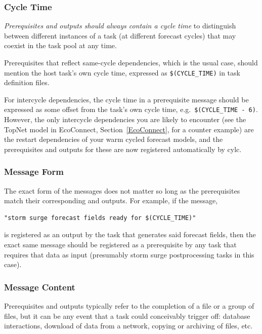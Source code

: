 \documentclass[11pt,a4paper]{article}
\begin{document}
\lstset{language=cylctaskdef} 

\subsubsection{Cycle Time}

{\em Prerequisites and outputs should always contain a cycle time} to
distinguish between different instances of a task (at different 
forecast cycles) that may coexist in the task pool at any time. 

Prerequisites that reflect same-cycle dependencies, which is the usual
case, should mention the host task's own cycle time, expressed as
\lstinline=$(CYCLE_TIME)= in task definition files.

For intercycle dependencies, the cycle time in a prerequisite message
should be expressed as some offset from the task's own cycle time, e.g.\
\lstinline=$(CYCLE_TIME - 6)=. However, the only intercycle dependencies
you are likely to encounter (see the TopNet model in EcoConnect,
Section~\ref{EcoConnect}, for a counter example) are the restart
dependencies of your warm cycled forecast models, and the prerequisites
and outputs for these are now registered automatically by cylc.

\subsubsection{Message Form}

The exact form of the messages does not matter so long as the
prerequisites match their corresponding and outputs. For example, if
the message, 
\begin{lstlisting}
"storm surge forecast fields ready for $(CYCLE_TIME)"
\end{lstlisting} 
is registered as an output by the task that generates said forecast
fields, then the exact same message should be registered as a
prerequisite by any task that requires that data as input
(presumably storm surge postprocessing tasks in this case). 

\subsubsection{Message Content}

Prerequisites and outputs typically refer to the completion of a file or
a group of files, but it can be any event that a task could conceivably
trigger off: database interactions, download of data from a network,
copying or archiving of files, etc.
\end{document}

